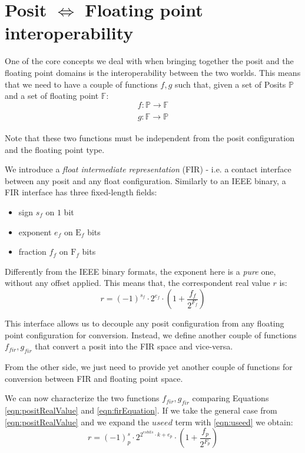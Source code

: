 \section{Posit $\Leftrightarrow$ Floating point  interoperability}

One of the core concepts we deal with when bringing together the posit and the floating point domains is the interoperability between the two worlds. This means that we need to have a couple of functions $f,g$ such that, given a set of Posits $\mathbb{P}$ and a set of floating point $\mathbb{F}$:
\begin{equation}
    f: \mathbb{P} \xrightarrow[]{} \mathbb{F}
\end{equation}
\begin{equation}
    g: \mathbb{F} \xrightarrow[]{} \mathbb{P}
\end{equation}

Note that these two functions must be independent from the posit configuration  and the floating point type.

We introduce a \textit{float intermediate representation} (FIR) - i.e. a contact interface between any posit and any float configuration. Similarly to an IEEE binary, a FIR interface has three fixed-length fields:
\begin{itemize}
    \item sign $s_f$ on $1$ bit
    \item exponent $e_f$ on $\text{E}_f$ bits
    \item fraction $f_f$ on $\text{F}_f$ bits
\end{itemize}

Differently from the IEEE binary formats, the exponent here is a \textit{pure} one, without any offset applied. This means that, the correspondent real value $r$ is:
\begin{equation}\label{eqn:firEquation}
    r = (-1)^{s_f} \cdot 2^{e_f} \cdot \left(1 + \frac{f_f}{2^{F_f}} \right)
\end{equation}

This interface allows us to decouple any posit configuration from any floating point configuration for conversion. Instead, we define another couple of functions $f_{fir}, 
g_{fir}$ that convert a posit into the FIR space and vice-versa.

From the other side, we just need to provide yet another couple of functions for conversion between FIR and floating point space.

We can now characterize the two functions $f_{fir}, g_{fir}$ comparing Equations \eqref{eqn:positRealValue} and \eqref{eqn:firEquation}. If we take the general case from \eqref{eqn:positRealValue} and we expand the $useed$ term with \eqref{eqn:useed} we obtain:
\begin{equation}\label{eqn:positRealExpanded}
    r = (-1)^s_p \cdot 2^{2^{esbits} \cdot k + e_p} \cdot \left ( 1+ \frac{f_p}{2^{F_p}} \right)
\end{equation}

